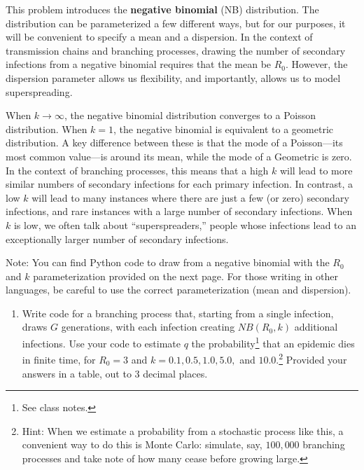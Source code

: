 \documentclass[11pt]{article}
\begin{document}
\begin{enumerate}
This problem introduces the {\bf negative binomial} (NB) distribution. The distribution can be parameterized a few different ways, but for our purposes, it will be convenient to specify a mean and a dispersion. In the context of transmission chains and branching processes, drawing the number of secondary infections from a negative binomial requires that the mean be $R_0$. However, the dispersion parameter allows us flexibility, and importantly, allows us to model superspreading. 

When $k \to \infty$, the negative binomial distribution converges to a Poisson distribution. When $k = 1$, the negative binomial is equivalent to a geometric distribution. A key difference between these is that the mode of a Poisson---its most common value---is around its mean, while the mode of a Geometric is zero. In the context of branching processes, this means that a high $k$ will lead to more similar numbers of secondary infections for each primary infection. In contrast, a low $k$ will lead to many instances where there are just a few (or zero) secondary infections, and rare instances with a large number of secondary infections. When $k$ is low, we often talk about ``superspreaders,'' people whose infections lead to an exceptionally larger number of secondary infections. 

Note: You can find Python code to draw from a negative binomial with the $R_0$ and $k$ parameterization provided on the next page. For those writing in other languages, be careful to use the correct parameterization (mean and dispersion).

\begin{enumerate}[label=\alph*.]
	\item Write code for a branching process that, starting from a single infection, draws $G$ generations, with each infection creating $NB(R_0,k)$ additional infections. Use your code to estimate $q$ the probability\footnote{See class notes.} that an epidemic dies in finite time, for $R_0=3$ and $k=0.1, 0.5, 1.0, 5.0,$ and $10.0$.\footnote{Hint: When we estimate a probability from a stochastic process like this, a convenient way to do this is Monte Carlo: simulate, say, $100,000$ branching processes and take note of how many cease before growing large.} Provided your answers in a table, out to 3 decimal places.
	

\end{enumerate}
\end{enumerate}
\end{document}
